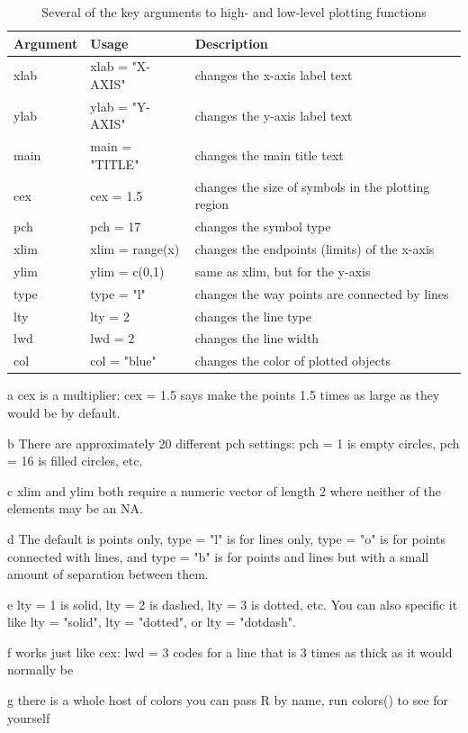 \documentclass[]{book}
\theoremstyle{definition}
\theoremstyle{definition}
\theoremstyle{definition}
\theoremstyle{remark}
\begin{document}
\begin{table}
\caption{\label{tab:plot-arg-table-pdf}Several of the key arguments to high- and low-level plotting functions}
\centering
\begin{threeparttable}
\begin{tabular}[t]{>{\ttfamily}l>{\ttfamily}l>{\raggedright\arraybackslash}p{25em}}
\toprule
Argument & Usage & Description\\
\midrule
xlab & xlab = "X-AXIS" & changes the x-axis label text\\
ylab & ylab = "Y-AXIS" & changes the y-axis label text\\
main & main = "TITLE" & changes the main title text\\
cex & cex = 1.5 & changes the size of symbols in the plotting region\\
pch & pch = 17 & changes the symbol type\\
\addlinespace
xlim & xlim = range(x) & changes the endpoints (limits) of the x-axis\\
ylim & ylim = c(0,1) & same as xlim, but for the y-axis\\
type & type = "l" & changes the way points are connected by lines\\
lty & lty = 2 & changes the line type\\
lwd & lwd = 2 & changes the line width\\
col & col = "blue" & changes the color of plotted objects\\
\bottomrule
\end{tabular}
\begin{tablenotes}
\item[a] cex is a multiplier: cex = 1.5 says make the points 1.5 times as large as they would be by default.
\item[b] There are approximately 20 different pch settings: pch = 1 is empty circles, pch = 16 is filled circles, etc.
\item[c] xlim and ylim both require a numeric vector of length 2 where neither of the elements may be an NA.
\item[d] The default is points only, type = "l" is for lines only, type = "o" is for points connected with lines, and type = "b" is for points and lines but with a small amount of separation between them.
\item[e] lty = 1 is solid, lty = 2 is dashed, lty = 3 is dotted, etc. You can also specific it like lty = "solid", lty = "dotted", or lty = "dotdash".
\item[f] works just like cex: lwd = 3 codes for a line that is 3 times as thick as it would normally be
\item[g] there is a whole host of colors you can pass R by name, run colors() to see for yourself
\end{tablenotes}
\end{threeparttable}
\end{table}
\end{document}
